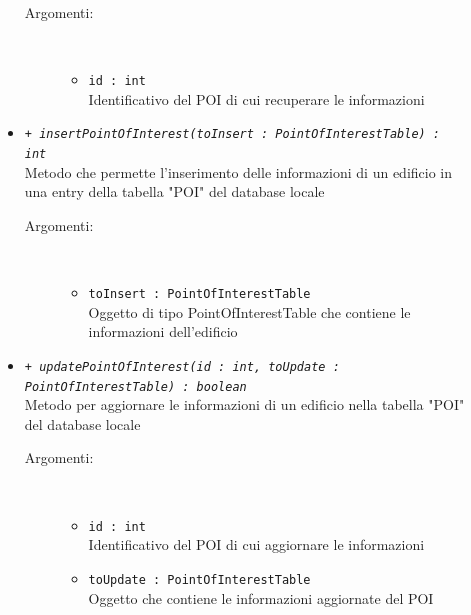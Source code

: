 \documentclass[../DefinizioneDiProdotto.tex]{subfiles}
\begin{document}
\begin{description}
\begin{itemize}
		\begin{description}
			\item[Argomenti:] \
			\begin{itemize}
				\item \texttt{id : int}\\
				Identificativo del POI di cui recuperare le informazioni\end{itemize}
		\end{description}
		\item \texttt{+ \textit{insertPointOfInterest(toInsert : PointOfInterestTable) : int}}\\
		Metodo che permette l'inserimento delle informazioni di un edificio in una entry della tabella "POI" del database locale
		\begin{description}
			\item[Argomenti:] \
			\begin{itemize}
				\item \texttt{toInsert : PointOfInterestTable}\\
				Oggetto di tipo PointOfInterestTable che contiene le informazioni dell'edificio\end{itemize}
		\end{description}
		\item \texttt{+ \textit{updatePointOfInterest(id : int, toUpdate : PointOfInterestTable) : boolean}}\\
		Metodo per aggiornare le informazioni di un edificio nella tabella "POI" del database locale
		\begin{description}
			\item[Argomenti:] \
			\begin{itemize}
				\item \texttt{id : int}\\
				Identificativo del POI di cui aggiornare le informazioni\item \texttt{toUpdate : PointOfInterestTable}\\
				Oggetto che contiene le informazioni aggiornate del POI\end{itemize}
		\end{description}
	\end{itemize}
\end{description}
\end{document}
